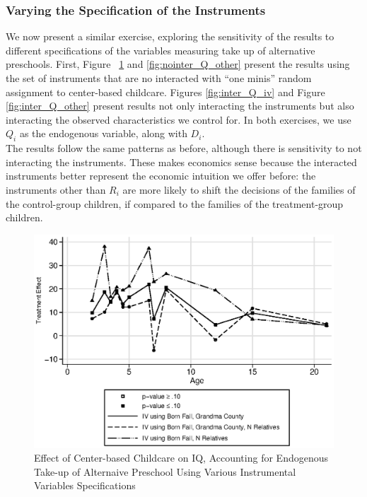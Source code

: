 \begin{appendices}
\subsubsection{Varying the Specification of the Instruments}

\noindent We now present a similar exercise, exploring the sensitivity of the results to different specifications of the variables measuring take up of alternative preschools. First, Figure~ \ref{fig:nointer_Q_iv} and \ref{fig:nointer_Q_other} present the results using the set of instruments that are no interacted with ``one minis'' random assignment to center-based childcare. Figures \ref{fig:inter_Q_iv} and Figure \ref{fig:inter_Q_other} present results not only interacting the instruments but also interacting the observed characteristics we control for. In both exercises, we use $Q_i$ as the endogenous variable, along with $D_i$.\\

\noindent The results follow the same patterns as before, although there is sensitivity to not interacting the instruments. These makes economics sense because the interacted instruments better represent the economic intuition we offer before: the instruments other than $R_{i}$ are more likely to shift the decisions of the families of the control-group children, if compared to the families of the treatment-group children. 

\begin{figure}[H]
		\caption{Effect of Center-based Childcare on IQ, Accounting for Endogenous Take-up of Alternaive Preschool Using Various Instrumental Variables Specifications} \label{fig:nointer_Q_iv}
		\includegraphics[width=.5\columnwidth]{output/appendixplots/nointer_Q_iv_te.eps}
\end{figure}


\end{appendices}
